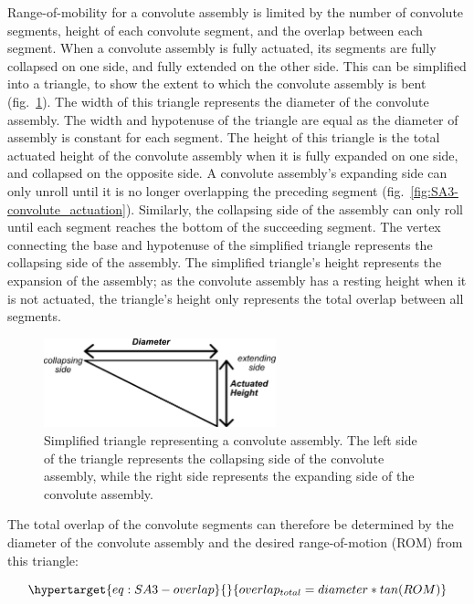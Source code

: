 \documentclass[defaultstyle,11pt]{thesis}
\begin{document}
Range-of-mobility for a convolute assembly is limited by the number of convolute segments, height of each convolute segment, and the overlap between each segment.
When a convolute assembly is fully actuated, its segments are fully collapsed on one side, and fully extended on the other side.
This can be simplified into a triangle, to show the extent to which the convolute assembly is bent (fig.~\ref{fig:SA3-convolute_tri}).
The width of this triangle represents the diameter of the convolute assembly.
The width and hypotenuse of the triangle are equal as the diameter of assembly is constant for each segment.
The height of this triangle is the total actuated height of the convolute assembly when it is fully expanded on one side, and collapsed on the opposite side.
A convolute assembly's expanding side can only unroll until it is no longer overlapping the preceding segment (fig.~\ref{fig:SA3-convolute_actuation}).
Similarly, the collapsing side of the assembly can only roll until each segment reaches the bottom of the succeeding segment.
The vertex connecting the base and hypotenuse of the simplified triangle represents the collapsing side of the assembly.
The simplified triangle's height represents the expansion of the assembly; as the convolute assembly has a resting height when it is not actuated, the triangle's height only represents the total overlap between all segments.

\begin{figure}
\hypertarget{fig:SA3-convolute_tri}{%
\centering
\includegraphics[width=0.6\textwidth,height=\textheight]{../fig/SA3/Convolute_Triangle.png}
\caption{Simplified triangle representing a convolute assembly. The left side of the triangle represents the collapsing side of the convolute assembly, while the right side represents the expanding side of the convolute assembly.}\label{fig:SA3-convolute_tri}
}
\end{figure}

The total overlap of the convolute segments can therefore be determined by the diameter of the convolute assembly and the desired range-of-motion (ROM) from this triangle:

\begin{equation}\protect\hypertarget{eq:SA3-overlap}{}{
overlap_{total} = diameter*tan(ROM)
}\label{eq:SA3-overlap}\end{equation}
\end{document}
